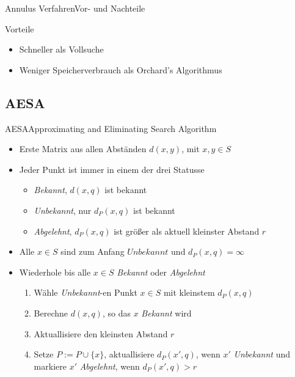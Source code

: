 \documentclass{beamer}
\begin{document}
\begin{frame}{Annulus Verfahren}{Vor- und Nachteile}
 \begin{block}{Vorteile}
  \begin{itemize}
   \item Schneller als Vollsuche
   \item Weniger Speicherverbrauch als Orchard’s Algorithmus
  \end{itemize}
 \end{block}
\end{frame}

\subsection{AESA}
\begin{frame}{AESA}{Approximating and Eliminating Search Algorithm}
 \begin{itemize}
  \item Erste Matrix aus allen Abständen $d(x, y)$, mit $x, y \in S$
  \pause
  \item Jeder Punkt ist immer in einem der drei Statusse
  \begin{itemize}
   \item \textit{Bekannt}, $d(x, q)$ ist bekannt
   \pause
   \item \textit{Unbekannt}, nur $d_P(x, q)$ ist bekannt
   \pause
   \item \textit{Abgelehnt}, $d_P(x, q)$ ist größer als aktuell kleinster Abstand $r$
  \end{itemize}
  \pause
  \item Alle $x \in S$ sind zum Anfang $Unbekannt$ und $d_P(x, q) = \infty$
  \pause
  \item Wiederhole bis alle $x \in S$ \textit{Bekannt} oder \textit{Abgelehnt}
  \begin{enumerate}
   \item Wähle \textit{Unbekannt}-en Punkt $x \in S$ mit kleinstem $d_P(x, q)$
   \pause
   \item Berechne $d(x,q)$, so das $x$ \textit{Bekannt} wird
   \pause
   \item Aktuallisiere den kleinsten Abstand $r$
   \pause
   \item Setze $P:= P \cup \{x\}$, aktuallisiere $d_P(x', q)$, wenn $x'$ \textit{Unbekannt} und markiere $x'$ \textit{Abgelehnt}, wenn $d_P(x', q) > r$
  \end{enumerate}
 \end{itemize}
\end{frame}
\end{document}
